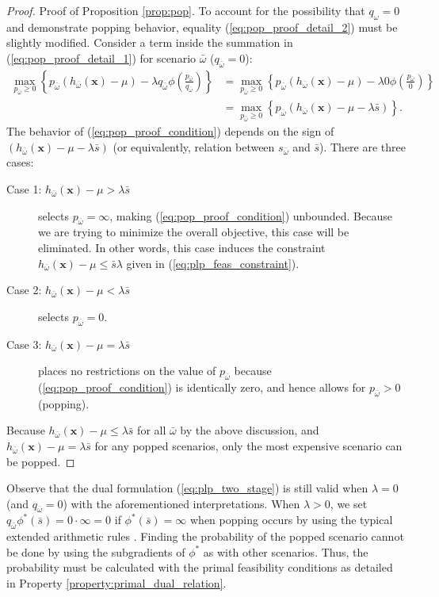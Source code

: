 \documentclass[opre,nonblindrev]{informs3} %
\newcommand{\x}{\mathbf{x}}
\begin{document}
\begin{proof}{\sc Proof of Proposition \ref{prop:pop}.}
	To account for the possibility that $q_\omega = 0$ and demonstrate popping behavior, equality (\ref{eq:pop_proof_detail_2}) must be slightly modified.
	Consider a term inside the summation in (\ref{eq:pop_proof_detail_1}) for scenario $\bar{\omega}$  ($q_{\bar{\omega}} = 0$):
	\begin{align}
		\max_{p_{\bar{\omega}} \geq 0} \left\{ p_{\bar{\omega}} (h_{\bar{\omega}}(\x) - \mu) - \lambda q_{\bar{\omega}}  \phi\left(\frac{p_{\bar{\omega}}}{q_{\bar{\omega}}}\right) \right\} & = \max_{p_{\bar{\omega}} \geq 0} \left\{ p_{\bar{\omega}} (h_{\bar{\omega}}(\x) - \mu) - \lambda 0  \phi\left(\frac{p_{\bar{\omega}}}{0}\right) \right\} \nonumber \\
		& = \max_{p_{\bar{\omega}} \geq 0} \left\{ p_{\bar{\omega}} \left( h_{\bar{\omega}}(\x) - \mu - \lambda \bar{s} \right) \right\}. \label{eq:pop_proof_condition}
	\end{align}
	The behavior of (\ref{eq:pop_proof_condition}) depends on the sign of $\left( h_{\bar{\omega}}(\x) - \mu - \lambda \bar{s}  \right)$ (or equivalently, relation between $s_{\bar{\omega}}$ and $\bar{s}$).
	There are three cases:
	\begin{description}
		\item[Case 1: $h_{\bar{\omega}}(\x) - \mu > \lambda \bar{s}$] selects $p_{\bar{\omega}} = \infty$, making (\ref{eq:pop_proof_condition}) unbounded. 
			Because we are trying to minimize the overall objective, this case will be eliminated. 
			In other words, this case induces the constraint $h_{\bar{\omega}}(\x) - \mu \leq \bar{s} \lambda$ given in (\ref{eq:plp_feas_constraint}). 
		\item[Case 2:  $h_{\bar{\omega}}(\x) - \mu < \lambda \bar{s}$] selects $p_{\bar{\omega}} = 0$.
		\item[Case 3: $h_{\bar{\omega}}(\x) - \mu = \lambda \bar{s}$] places no restrictions on the value of $p_{\bar{\omega}}$ because (\ref{eq:pop_proof_condition}) is identically zero, and hence allows for $p_{\bar{\omega}} > 0$ (popping). 
	\end{description}
	Because $h_{\bar{\omega}}(\x) - \mu \leq \lambda \bar{s}$ for all ${\bar{\omega}}$ by the above discussion, and $h_{\bar{\omega}}(\x) - \mu = \lambda \bar{s}$ for any popped scenarios, only the most expensive scenario can be popped.
	\Halmos
\end{proof}


Observe that the dual formulation (\ref{eq:plp_two_stage}) is still valid when $\lambda=0$ (and $q_{\bar{\omega}} = 0$) with the aforementioned interpretations. 
When $\lambda>0$, we set  $q_{\bar{\omega}}\phi^*(\bar{s}) = 0 \cdot \infty = 0$ if $\phi^*(\bar{s})= \infty$ when popping occurs by using the typical extended arithmetic rules \citep[]{rockafellar_70}. 
Finding the probability of the popped scenario cannot be done by using the subgradients of $\phi^*$ as with other scenarios.
Thus, the probability must be calculated with the primal feasibility conditions as detailed in Property \ref{property:primal_dual_relation}.
\end{document}
